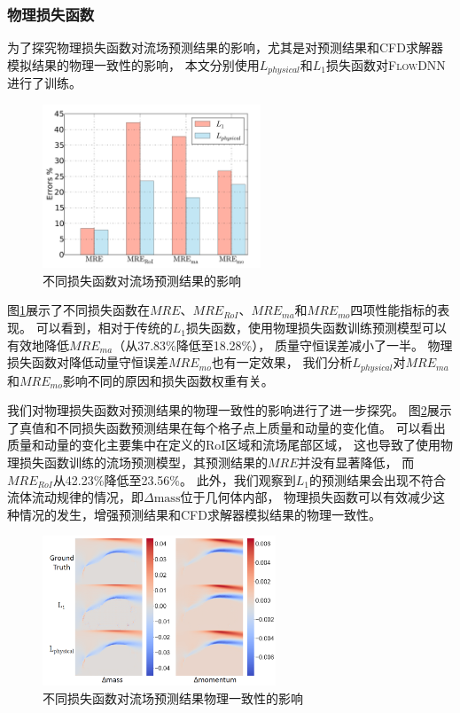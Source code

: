 \subsubsection{物理损失函数}\label{phy_effect}

为了探究物理损失函数对流场预测结果的影响，尤其是对预测结果和CFD求解器模拟结果的物理一致性的影响，
本文分别使用$L_{physical}$和$L_{1}$损失函数对\textsc{FlowDNN}进行了训练。

\begin{figure}[htp]
	\centering
	\includegraphics[width=0.58\textwidth]{./figures/data/data_pre/loss_comp.pdf}
	\caption{不同损失函数对流场预测结果的影响}
	\label{fig:phy_bar_comp}
\end{figure}

\noindent 图\ref{fig:phy_bar_comp}展示了不同损失函数在$MRE$、$MRE_{RoI}$、$MRE_{ma}$和$MRE_{mo}$四项性能指标的表现。
可以看到，相对于传统的$L_{1}$损失函数，使用物理损失函数训练预测模型可以有效地降低$MRE_{ma}$（从37.83\%降低至18.28\%），
质量守恒误差减小了一半。
物理损失函数对降低动量守恒误差$MRE_{mo}$也有一定效果，
我们分析$L_{physical}$对$MRE_{ma}$和$MRE_{mo}$影响不同的原因和损失函数权重有关。

我们对物理损失函数对预测结果的物理一致性的影响进行了进一步探究。
图\ref{fig:phy_hotmap}展示了真值和不同损失函数预测结果在每个格子点上质量和动量的变化值。
可以看出质量和动量的变化主要集中在定义的RoI区域和流场尾部区域，
这也导致了使用物理损失函数训练的流场预测模型，其预测结果的$MRE$并没有显著降低，
而$MRE_{RoI}$从42.23\%降低至23.56\%。
此外，我们观察到$L_{1}$的预测结果会出现不符合流体流动规律的情况，即$\Delta \mathrm{mass}$位于几何体内部，
物理损失函数可以有效减少这种情况的发生，增强预测结果和CFD求解器模拟结果的物理一致性。


\begin{figure}[htp]
	\centering
	\includegraphics[width=0.62\textwidth]{./figures/data/loss_comp_case/loss_comp.png}
	\caption{不同损失函数对流场预测结果物理一致性的影响}	
	\label{fig:phy_hotmap}	
\end{figure}

